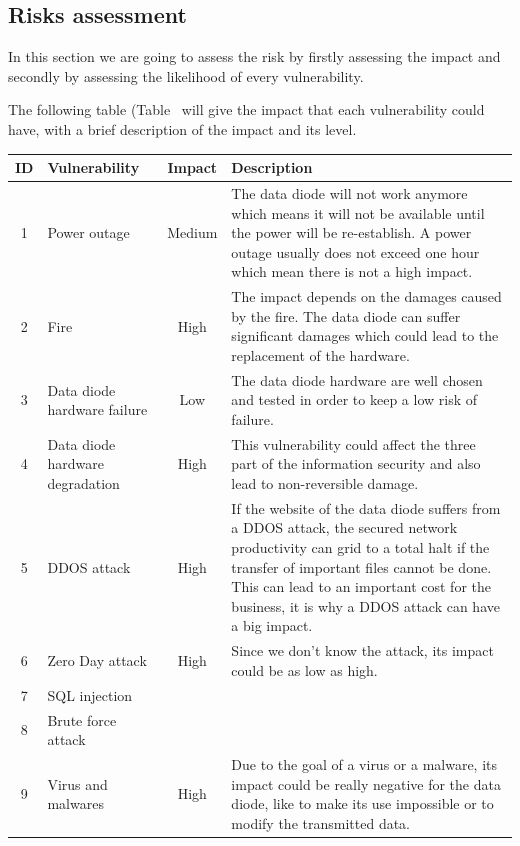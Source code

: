 \documentclass[a4paper,10pt]{article}
\begin{document}
\subsection{Risks assessment}
In this section we are going to assess the risk by firstly assessing the impact and secondly by assessing the likelihood of every vulnerability. 

The following table (Table \ will give the impact that each vulnerability could have, with a brief description of the impact and its level.

\begin{longtable}{|c|p{2.5cm}|c|p{10cm}|}
\hline
\textbf{ID}& \textbf{Vulnerability} &\textbf{Impact} & \textbf{Description}                 \\
\hline
1 & Power outage & Medium  &  The data diode will not work anymore which means it will not be available until the power will be re-establish. A power outage usually does not exceed one hour which mean there is not a high impact. \\
\hline
2 & Fire & High  &  The impact depends on the damages caused by the fire. The data diode can suffer significant damages which could lead to the replacement of the hardware.\\
\hline
3 & Data diode hardware failure  & Low & The data diode hardware are well chosen and tested in order to keep a low risk of failure.\\ 
\hline
4 & Data diode hardware degradation & High & This vulnerability could affect the three part of the information security and also lead to non-reversible damage. \\
\hline
5 & DDOS attack & High & If the website of the data diode suffers from a DDOS attack, the secured network productivity can grid to a total halt if the transfer of important files cannot be done. This can lead to an important cost for the business, it is why a DDOS attack can have a big impact.\\
\hline
6 & Zero Day attack & High & Since we don't know the attack, its impact could be as low as high.\\
\hline
7 &  SQL injection & & \\
\hline
8 & Brute force attack & & \\
\hline
9 & Virus and malwares & High & Due to the goal of a virus or a malware, its impact could be really negative for the data diode, like to make its use impossible or to modify the transmitted data. \\

\end{longtable}
\end{document}
